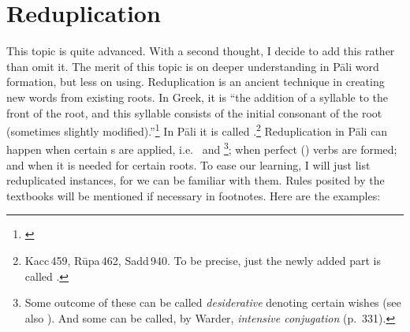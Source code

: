 {}
\section*{Reduplication}\label{sec:redup}

This topic is quite advanced. With a second thought, I decide to add this rather than omit it. The merit of this topic is on deeper understanding in P\=ali word formation, but less on using. Reduplication is an ancient technique in creating new words from existing roots. In Greek, it is ``the addition of a syllable to the front of the root, and this syllable consists of the initial consonant of the root (sometimes slightly modified).''\footnote{\citealp[p.~134]{fairbairn:understanding}} In P\=ali it is called .\footnote{Kacc\,459, R\=upa\,462, Sadd\,940. To be precise, just the newly added part is called .} Reduplication in P\=ali can happen when certain s are applied, i.e.\  and \footnote{Some outcome of these can be called \emph{desiderative} denoting certain wishes (see also \citealp[pp.~352--3]{warder:intro}). And some can be called, by Warder, \emph{intensive conjugation} (p.~331).}; when perfect () verbs are formed; and when it is needed for certain roots. To ease our learning, I will just list reduplicated instances, for we can be familiar with them. Rules posited by the textbooks will be mentioned if necessary in footnotes. Here are the examples:

